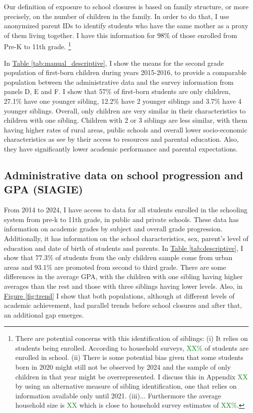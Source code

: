 Our definition of exposure to school closures is based on family structure, or more precisely, on the number of children in the family. In order to do that, I use anonymized parent IDs to identify students who have the same mother as a proxy of them living together. I have this information for \textcolor{black}{98\%} of those enrolled from Pre-K to 11th grade. \footnote{There are potential concerns with this identification of siblings: (i) It relies on students being enrolled. According to household surveys, \textcolor{green}{XX\%} of students are enrolled in school. (ii) There is some potential bias given that some students born in 2020 might still not be observed by 2024 and the sample of only children in that year might be overrepresented. I discuss this in Appendix \textcolor{green}{XX} by using an alternative measure of sibling identification, one that relies on information available only until 2021. (iii)... Furthermore the average household size is \textcolor{green}{XX} which is close to household survey estimates of \textcolor{green}{XX\%}.} 

In \hyperref[tab:manual_descriptive]{Table \ref{tab:manual_descriptive}}, I show the means for the second grade population of first-born children during years 2015-2016, to provide a comparable population between the administrative data and the survey information from panels D, E and F. I show that 57\% of first-born students are only children, 27.1\% have one younger sibling, 12.2\% have 2 younger siblings and 3.7\% have 4 younger siblings. Overall, only children are very similar in their characteristics to children with one sibling. Children with 2 or 3 siblings are less similar, with them having higher rates of rural areas, public schools and overall lower socio-economic characteristics as see by their access to resources and parental education. Also, they have significantly lower academic performance and parental expectations.


\subsection{Administrative data on school progression and GPA (SIAGIE)}

From 2014 to 2024, I have access to data for all students enrolled in the schooling system from pre-k to 11th grade, in public and private schools. These data has information on academic grades by subject and overall grade progression. Additionally, it has information on the school characteristics, sex, parent's level of education and date of birth of students and parents. In \hyperref[tab:descriptive]{Table \ref{tab:descriptive}}, I show that 77.3\% of students from the only children sample come from urban areas and 93.1\% are promoted from second to third grade. There are some differences in the average GPA, with the children with one sibling having higher averages than the rest and those with three siblings having lower levels. Also, in \hyperref[fig:trend]{Figure \ref{fig:trend}} I show that both populations, although at different levels of academic achievement, had parallel trends before school closures and after that, an additional gap emerges.

